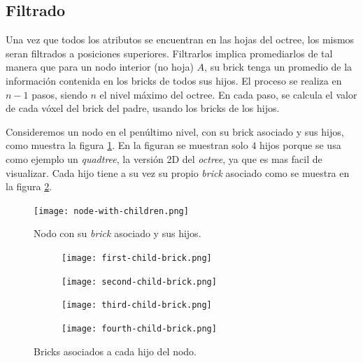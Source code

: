 \subsection{Filtrado}\label{design:filtering}

Una vez que todos los atributos se encuentran en las hojas del octree, los mismos seran filtrados a posiciones superiores.
Filtrarlos implica promediarlos de tal manera que para un nodo interior (no hoja) $A$, su brick tenga un promedio de la información contenida en los bricks de todos sus hijos.
El proceso se realiza en $n - 1$ pasos, siendo $n$ el nivel máximo del octree.
En cada paso, se calcula el valor de cada vóxel del brick del padre, usando los bricks de los hijos.

Consideremos un nodo en el penúltimo nivel, con su brick asociado y sus hijos, como muestra la figura \ref{fig:node_with_children}.
En la figuran se muestran solo $4$ hijos porque se usa como ejemplo un \textit{quadtree}, la versión 2D del \textit{octree}, ya que es mas facil de visualizar.
Cada hijo tiene a su vez su propio \textit{brick} asociado como se muestra en la figura \ref{fig:all_child_bricks}.

\begin{figure}[h!]
    \centering
    \texttt{[image: node-with-children.png]}
    \caption{Nodo con su \textit{brick} asociado y sus hijos.}
    \label{fig:node_with_children}
\end{figure}

\begin{figure}[h!]
    \begin{center}
        \begin{subfigure}{.24\textwidth}
            \texttt{[image: first-child-brick.png]}
        \end{subfigure}
        \begin{subfigure}{.24\textwidth}
            \texttt{[image: second-child-brick.png]}
        \end{subfigure}
        \begin{subfigure}{.24\textwidth}
            \texttt{[image: third-child-brick.png]}
        \end{subfigure}
        \begin{subfigure}{.24\textwidth}
            \texttt{[image: fourth-child-brick.png]}
        \end{subfigure}
    \end{center}
    \caption{Bricks asociados a cada hijo del nodo.}
    \label{fig:all_child_bricks}
\end{figure}

